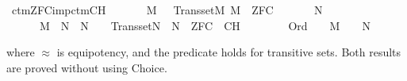 \begin{isabelle}
\isamarkupfalse%
\ ctm{\isacharunderscore}{\kern0pt}ZFC{\isacharunderscore}{\kern0pt}imp{\isacharunderscore}{\kern0pt}ctm{\isacharunderscore}{\kern0pt}CH{\isacharcolon}{\kern0pt}\isanewline
\ \ \isanewline
\ \ \ \ {\isachardoublequoteopen}M\ {\isasymapprox}\ {\isasymomega}{\isachardoublequoteclose}\ {\isachardoublequoteopen}Transset{\isacharparenleft}{\kern0pt}M{\isacharparenright}{\kern0pt}{\isachardoublequoteclose}\ {\isachardoublequoteopen}M\ {\isasymTurnstile}\ ZFC{\isachardoublequoteclose}\isanewline
\ \ \isanewline
\ \ \ \ {\isachardoublequoteopen}{\isasymexists}N{\isachardot}{\kern0pt}\isanewline
\ \ \ \ \ \ M\ {\isasymsubseteq}\ N\ {\isasymand}\ N\ {\isasymapprox}\ {\isasymomega}\ {\isasymand}\ Transset{\isacharparenleft}{\kern0pt}N{\isacharparenright}{\kern0pt}\ {\isasymand}\ N\ {\isasymTurnstile}\ ZFC\ {\isasymunion}\ {\isacharbraceleft}{\kern0pt}{\isasymcdot}CH{\isasymcdot}{\isacharbraceright}{\kern0pt}\ {\isasymand}\isanewline
\ \ \ \ \ \ {\isacharparenleft}{\kern0pt}{\isasymforall}{\isasymalpha}{\isachardot}{\kern0pt}\ Ord{\isacharparenleft}{\kern0pt}{\isasymalpha}{\isacharparenright}{\kern0pt}\ {\isasymlongrightarrow}\ {\isacharparenleft}{\kern0pt}{\isasymalpha}\ {\isasymin}\ M\ {\isasymlongleftrightarrow}\ {\isasymalpha}\ {\isasymin}\ N{\isacharparenright}{\kern0pt}{\isacharparenright}{\kern0pt}{\isachardoublequoteclose}
\end{isabelle}
where $\approx$ is equipotency, and the predicate 
holds for
transitive sets. Both results are proved without using Choice.

